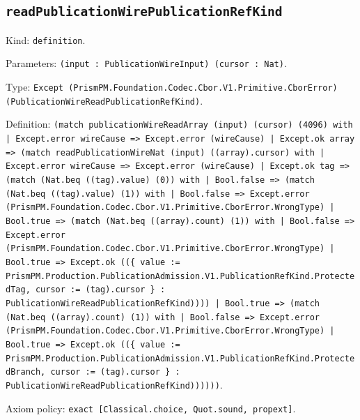 \documentclass[11pt]{article}
\begin{document}
\subsection*{\texttt{readPublicationWirePublicationRefKind}}
\noindent Kind: \texttt{definition}.\par
\noindent Parameters: \texttt{(input : PublicationWireInput) (cursor : Nat)}.\par
\noindent Type: \texttt{Except (PrismPM.Foundation.Codec.Cbor.V1.Primitive.CborError) (PublicationWireReadPublicationRefKind)}.\par
\noindent Definition: \texttt{(match publicationWireReadArray (input) (cursor) (4096) with | Except.error wireCause => Except.error (wireCause) | Except.ok array => (match readPublicationWireNat (input) ((array).cursor) with | Except.error wireCause => Except.error (wireCause) | Except.ok tag => (match (Nat.beq ((tag).value) (0)) with | Bool.false => (match (Nat.beq ((tag).value) (1)) with | Bool.false => Except.error (PrismPM.Foundation.Codec.Cbor.V1.Primitive.CborError.WrongType) | Bool.true => (match (Nat.beq ((array).count) (1)) with | Bool.false => Except.error (PrismPM.Foundation.Codec.Cbor.V1.Primitive.CborError.WrongType) | Bool.true => Except.ok ((\{ value := PrismPM.Production.PublicationAdmission.V1.PublicationRefKind.ProtectedTag, cursor := (tag).cursor \} : PublicationWireReadPublicationRefKind)))) | Bool.true => (match (Nat.beq ((array).count) (1)) with | Bool.false => Except.error (PrismPM.Foundation.Codec.Cbor.V1.Primitive.CborError.WrongType) | Bool.true => Except.ok ((\{ value := PrismPM.Production.PublicationAdmission.V1.PublicationRefKind.ProtectedBranch, cursor := (tag).cursor \} : PublicationWireReadPublicationRefKind))))))}.\par
\noindent Axiom policy: \texttt{exact [Classical.choice, Quot.sound, propext]}.\par
\end{document}
